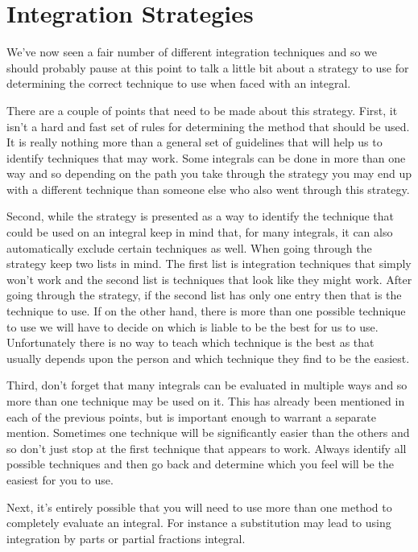 \section{Integration Strategies}\label{sec:int_techniques}

We've now seen a fair number of different integration techniques and so we should probably pause at this point to talk a little bit about a strategy to use for determining the correct technique to use when faced with an integral.

There are a couple of points that need to be made about this strategy. First, it isn't a hard and fast set of rules for determining the method that should be used. It is really nothing more than a general set of guidelines that will help us to identify techniques that may work. Some integrals can be done in more than one way and so depending on the path you take through the strategy you may end up with a different technique than someone else who also went through this strategy.

Second, while the strategy is presented as a way to identify the technique that could be used on an integral keep in mind that, for many integrals, it can also automatically exclude certain techniques as well. When going through the strategy keep two lists in mind. The first list is integration techniques that simply won't work and the second list is techniques that look like they might work. After going through the strategy, if the second list has only one entry then that is the technique to use. If on the other hand, there is more than one possible technique to use we will have to decide on which is liable to be the best for us to use. Unfortunately there is no way to teach which technique is the best as that usually depends upon the person and which technique they find to be the easiest.

Third, don't forget that many integrals can be evaluated in multiple ways and so more than one technique may be used on it. This has already been mentioned in each of the previous points, but is important enough to warrant a separate mention. Sometimes one technique will be significantly easier than the others and so don't just stop at the first technique that appears to work. Always identify all possible techniques and then go back and determine which you feel will be the easiest for you to use.

Next, it's entirely possible that you will need to use more than one method to completely evaluate an integral. For instance a substitution may lead to using integration by parts or partial fractions integral.

